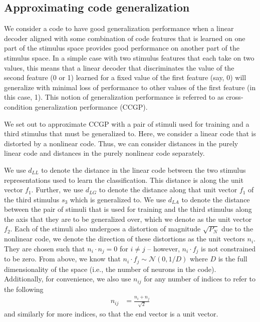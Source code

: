 \documentclass[letter,12pt]{article}
\newcommand{\dll}{d_{LL}}
\newcommand{\dlg}{d_{LG}}
\newcommand{\dla}{d_{LA}}
\newcommand{\dis}{\mathcal{N}(0, 1/D)}
\begin{document}
\subsection{Approximating code generalization}
We consider a code to have good generalization performance when a linear decoder
aligned with some combination of code features that is learned on one part of the
stimulus space provides good performance on another part of the stimulus space.
In a simple case with two stimulus features that each take on two values, this
means that a linear decoder that discriminates the value of the second feature
(0 or 1) learned for a fixed value of the first feature (say, 0) will generalize
with minimal loss of performance to other values of the first feature (in this
case, 1). This notion of generalization performance is referred to as
cross-condition generalization performance (CCGP).

We set out to approximate CCGP with a pair of stimuli used for training and
a third stimulus that must be generalized to. Here, we consider a linear code
that is distorted by a nonlinear code.
Thus, we can consider distances in the purely linear code and distances in the
purely nonlinear code separately.

We use $\dll$ to denote the distance in the linear code between the two
stimulus representations used to learn the classification. This distance is
along the unit vector $f_{1}$. Further, we use $\dlg$ to denote the distance
along that unit vector $f_{1}$ of the third stimulus $s_{3}$ which is generalized
to. We use $\dla$ to
denote the distance between the pair of stimuli that is used for training and
the third stimulus along the axis that they are
to be generalized over, which we denote as the unit vector $f_{2}$. Each of the
stimuli also undergoes a distortion of magnitude $\sqrt{P_{N}}$ due to the
nonlinear code, we denote the direction of these distortions as the unit
vectors $n_{i}$. They are chosen such that
$n_{i} \cdot n_{j} = 0$ for $i \ne j$ -- however, $n_{i} \cdot f_{j}$ is not
constrained to be zero. From above, we know that
$n_{i} \cdot f_{j} \sim \dis$ where $D$ is the
full dimensionality of the space (i.e., the number of neurons in the code).
Additionally, for convenience, we also use $n_{ij}$ for any number of indices
to refer to the following
\begin{align}
  n_{ij} &= \frac{n_{i} + n_{j}}{\sqrt{2}}
\end{align}
and similarly for more indices, so that the end vector is a unit vector.
\end{document}
